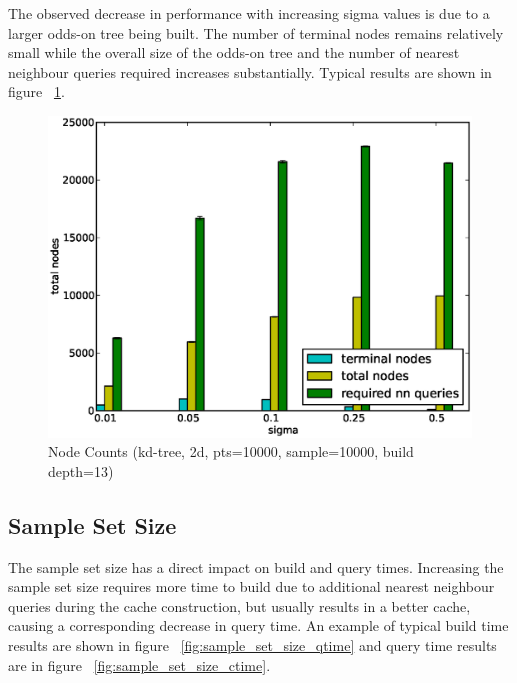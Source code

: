 \documentclass[mcs]{scsthesis}
\begin{document}
The observed decrease in performance with increasing sigma values is due to
a larger odds-on tree being built. The number of terminal nodes remains
relatively small while the overall size of the odds-on tree and the number of
nearest neighbour queries required increases substantially. Typical results are
shown in figure ~\ref{fig:node_counts}.

\begin{figure}
\begin{center}
\includegraphics[scale=0.5]{diagrams/2d_pts10000_sample10000_builddata.eps}
\caption{Node Counts (kd-tree, 2d, pts=10000, sample=10000, build depth=13)}
\label{fig:node_counts}
\end{center}
\end{figure}

\subsection{Sample Set Size}

The sample set size has a direct impact on build and query times. Increasing
the sample set size requires more time to build due to additional nearest
neighbour queries during the cache construction, but usually results in a
better cache, causing a corresponding decrease in query time.  An example
of typical build time results are shown in figure
~\ref{fig:sample_set_size_qtime} and query time results are in figure
~\ref{fig:sample_set_size_ctime}.
\end{document}
